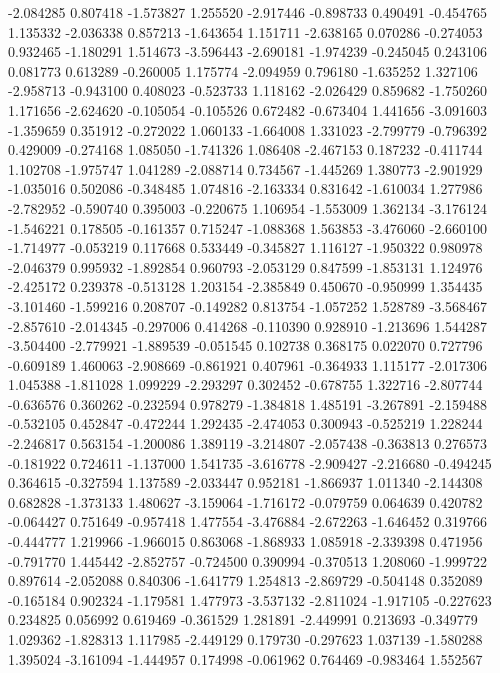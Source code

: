 -2.084285
0.807418
-1.573827
1.255520
-2.917446
-0.898733
0.490491
-0.454765
1.135332
-2.036338
0.857213
-1.643654
1.151711
-2.638165
0.070286
-0.274053
0.932465
-1.180291
1.514673
-3.596443
-2.690181
-1.974239
-0.245045
0.243106
0.081773
0.613289
-0.260005
1.175774
-2.094959
0.796180
-1.635252
1.327106
-2.958713
-0.943100
0.408023
-0.523733
1.118162
-2.026429
0.859682
-1.750260
1.171656
-2.624620
-0.105054
-0.105526
0.672482
-0.673404
1.441656
-3.091603
-1.359659
0.351912
-0.272022
1.060133
-1.664008
1.331023
-2.799779
-0.796392
0.429009
-0.274168
1.085050
-1.741326
1.086408
-2.467153
0.187232
-0.411744
1.102708
-1.975747
1.041289
-2.088714
0.734567
-1.445269
1.380773
-2.901929
-1.035016
0.502086
-0.348485
1.074816
-2.163334
0.831642
-1.610034
1.277986
-2.782952
-0.590740
0.395003
-0.220675
1.106954
-1.553009
1.362134
-3.176124
-1.546221
0.178505
-0.161357
0.715247
-1.088368
1.563853
-3.476060
-2.660100
-1.714977
-0.053219
0.117668
0.533449
-0.345827
1.116127
-1.950322
0.980978
-2.046379
0.995932
-1.892854
0.960793
-2.053129
0.847599
-1.853131
1.124976
-2.425172
0.239378
-0.513128
1.203154
-2.385849
0.450670
-0.950999
1.354435
-3.101460
-1.599216
0.208707
-0.149282
0.813754
-1.057252
1.528789
-3.568467
-2.857610
-2.014345
-0.297006
0.414268
-0.110390
0.928910
-1.213696
1.544287
-3.504400
-2.779921
-1.889539
-0.051545
0.102738
0.368175
0.022070
0.727796
-0.609189
1.460063
-2.908669
-0.861921
0.407961
-0.364933
1.115177
-2.017306
1.045388
-1.811028
1.099229
-2.293297
0.302452
-0.678755
1.322716
-2.807744
-0.636576
0.360262
-0.232594
0.978279
-1.384818
1.485191
-3.267891
-2.159488
-0.532105
0.452847
-0.472244
1.292435
-2.474053
0.300943
-0.525219
1.228244
-2.246817
0.563154
-1.200086
1.389119
-3.214807
-2.057438
-0.363813
0.276573
-0.181922
0.724611
-1.137000
1.541735
-3.616778
-2.909427
-2.216680
-0.494245
0.364615
-0.327594
1.137589
-2.033447
0.952181
-1.866937
1.011340
-2.144308
0.682828
-1.373133
1.480627
-3.159064
-1.716172
-0.079759
0.064639
0.420782
-0.064427
0.751649
-0.957418
1.477554
-3.476884
-2.672263
-1.646452
0.319766
-0.444777
1.219966
-1.966015
0.863068
-1.868933
1.085918
-2.339398
0.471956
-0.791770
1.445442
-2.852757
-0.724500
0.390994
-0.370513
1.208060
-1.999722
0.897614
-2.052088
0.840306
-1.641779
1.254813
-2.869729
-0.504148
0.352089
-0.165184
0.902324
-1.179581
1.477973
-3.537132
-2.811024
-1.917105
-0.227623
0.234825
0.056992
0.619469
-0.361529
1.281891
-2.449991
0.213693
-0.349779
1.029362
-1.828313
1.117985
-2.449129
0.179730
-0.297623
1.037139
-1.580288
1.395024
-3.161094
-1.444957
0.174998
-0.061962
0.764469
-0.983464
1.552567
